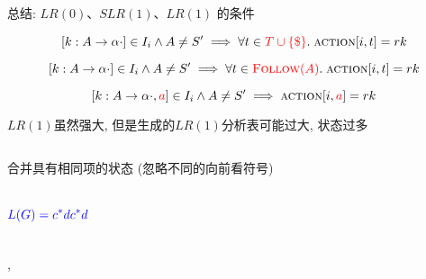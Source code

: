 \begin{frame}{}
  \begin{center}
    总结: $LR(0)$、$SLR(1)$、$LR(1)$ 的条件

    \[
      [k: A \to \alpha \cdot] \in I_{i} \land A \neq S' \implies
        \forall t \in \textcolor{red}{T \cup \{\$\}}.\; \textsc{action}[i, t] = rk
    \]

    \[
      [k: A \to \alpha \cdot] \in I_{i} \land A \neq S' \implies
        \forall t \in \textcolor{red}{\textsc{Follow}(A)}.\; \textsc{action}[i, t] = rk
    \]

    \[
      [k: A \to \alpha \cdot, \textcolor{red}{a}] \in I_{i} \land A \neq S' \implies
        \textsc{action}[i, \textcolor{red}{a}] = rk
    \]
  \end{center}
\end{frame}

\begin{frame}{}
  \begin{center}
    $LR(1)$虽然强大, 但是生成的$LR(1)$分析表可能过大, 状态过多
    \vspace{-0.30cm}

    \begin{columns}
    \end{columns}

    \pause
    \vspace{0.10cm}
     合并具有相同项的状态 (忽略不同的向前看符号)
  \end{center}
\end{frame}

\begin{frame}{}
  \begin{center}
    \begin{columns}


        \[
          \textcolor{blue}{L(G) = c^{\ast}dc^{\ast}d}
        \]
    \end{columns}

    \vspace{0.20cm}
    ,
    \pause {}
  \end{center}
\end{frame}

